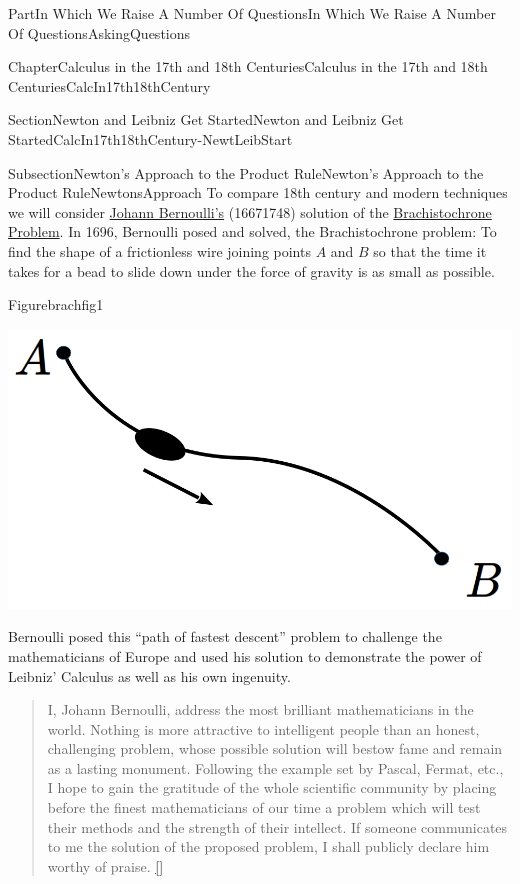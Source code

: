 \documentclass[oneside,10pt,]{book}
\newcommand{\xreffont}{\relax}
\numberwithin{equation}{part}
\begin{document}
\begin{partptx}{Part}{In Which We Raise A Number Of Questions}{}{In Which We Raise A Number Of Questions}{}{}{AskingQuestions}
\begin{chapterptx}{Chapter}{Calculus in the 17th and 18th Centuries}{}{Calculus in the 17th and 18th Centuries}{}{}{CalcIn17th18thCentury}
\begin{sectionptx}{Section}{Newton and Leibniz Get Started}{}{Newton and Leibniz Get Started}{}{}{CalcIn17th18thCentury-NewtLeibStart}
\begin{subsectionptx}{Subsection}{Newton's Approach to the Product Rule}{}{Newton's Approach to the Product Rule}{}{}{NewtonsApproach}
 To compare 18th century and modern techniques we will consider \href{https://mathshistory.st-andrews.ac.uk/Biographies/Bernoulli_Johann/}{Johann Bernoulli's} (1667\textendash{}1748) solution of the \href{https://mathshistory.st-andrews.ac.uk/HistTopics/Brachistochrone/}{Brachistochrone Problem}.  In 1696, Bernoulli posed and solved, the Brachistochrone problem: To find the shape of a frictionless wire joining points \(A\) and \(B\) so that the time it takes for a bead to slide down under the force of gravity is as small as possible.%
\begin{figureptx}{Figure}{}{brachfig1}{}%
\begin{image}{0.225}{0.55}{0.225}{}%
\includegraphics[width=\linewidth]{external/images/brachfig1-1.png}
\end{image}%
\tcblower
\end{figureptx}%
 Bernoulli posed this ``path of fastest descent'' problem to challenge the mathematicians of Europe and used his solution to demonstrate the power of Leibniz' Calculus as well as his own ingenuity.%
\begin{quote}%
I, Johann Bernoulli, address the most brilliant mathematicians in the world. Nothing is more attractive to intelligent people than an honest, challenging problem, whose possible solution will bestow fame and remain as a lasting monument. Following the example set by Pascal, Fermat, etc., I hope to gain the gratitude of the whole scientific community by placing before the finest mathematicians of our time a problem which will test their methods and the strength of their intellect. If someone communicates to me the solution of the proposed problem, I shall publicly declare him worthy of praise. \hyperlink{Bernoulli_bio_mactutor}{[{\xreffont 11}]}%

\end{quote}
\end{subsectionptx}
\end{sectionptx}
\end{chapterptx}
\end{partptx}
\end{document}
